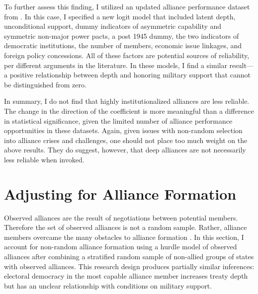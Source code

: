 \documentclass[12pt]{article}
\begin{document}
To further assess this finding, I utilized an updated alliance performance dataset from \citet{BerkemeierFuhrmann2018}.
In this case, I specified a new logit model that included latent depth, unconditional support, dummy indicators of asymmetric capability and symmetric non-major power pacts, a post 1945 dummy, the two indicators of democratic institutions, the number of members, economic issue linkages, and foreign policy concessions. 
All of these factors are potential sources of reliability, per different arguments in the literature. 
In these models, I find a similar result--- a positive relationship between depth and honoring military support that cannot be distinguished from zero.


In summary, I do not find that highly institutionalized alliances are less reliable. 
The change in the direction of the coefficient is more meaningful than a difference in statistical significance, given the limited number of alliance performance opportunities in these datasets. 
Again, given issues with non-random selection into alliance crises and challenges, one should not place too much weight on the above results. 
They do suggest, however, that deep alliances are not necessarily less reliable when invoked. 



\section{Adjusting for Alliance Formation}



Observed alliances are the result of negotiations between potential members. 
Therefore the set of observed alliances is not a random sample.
Rather, alliance members overcame the many obstacles to alliance formation \citep{Poast2019a}.  
In this section, I account for non-random alliance formation using a hurdle model of observed alliances after combining a stratified random sample of non-allied groups of states with observed alliances. 
This research design produces partially similar inferences: electoral democracy in the most capable alliance member increases treaty depth but has an unclear relationship with conditions on military support. 
\end{document}
